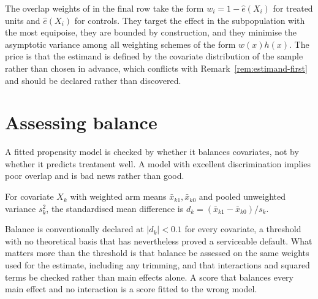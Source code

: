 The overlap weights of \citet{okafor2011overlap} in the
final row take the form
$w_i = 1 - \hat{e}(X_i)$ for treated units and $\hat{e}(X_i)$ for controls.
They target the effect in the subpopulation with the most equipoise, they are
bounded by construction, and they minimise the asymptotic variance among all
weighting schemes of the form $w(x) h(x)$. The price is that the estimand is
defined by the covariate distribution of the sample rather than chosen in
advance, which conflicts with Remark~\ref{rem:estimand-first} and should be
declared rather than discovered.

\section{Assessing balance}
\label{sec:ps-balance}

A fitted propensity model is checked by whether it balances covariates, not by
whether it predicts treatment well. A model with excellent discrimination
implies poor overlap and is bad news rather than good.

\begin{definition}
\label{def:smd}
For covariate $X_k$ with weighted arm means $\bar{x}_{k1}, \bar{x}_{k0}$ and
pooled unweighted variance $s_k^{2}$, the standardised mean difference is
$d_k = (\bar{x}_{k1} - \bar{x}_{k0}) / s_k$.
\end{definition}

Balance is conventionally declared at $|d_k| < 0.1$ for every covariate, a
threshold with no theoretical basis that has nevertheless proved a serviceable
default. What matters more than the threshold is that balance be assessed on
the same weights used for the estimate, including any trimming, and that
interactions and squared terms be checked rather than main effects alone. A
score that balances every main effect and no interaction is a score fitted to
the wrong model.
